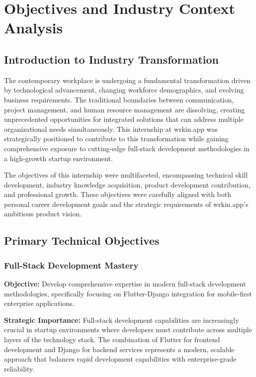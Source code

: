 \chapter{Objectives and Industry Context Analysis}

\section{Introduction to Industry Transformation}

The contemporary workplace is undergoing a fundamental transformation driven by technological advancement, changing workforce demographics, and evolving business requirements. The traditional boundaries between communication, project management, and human resource management are dissolving, creating unprecedented opportunities for integrated solutions that can address multiple organizational needs simultaneously. This internship at wrkin.app was strategically positioned to contribute to this transformation while gaining comprehensive exposure to cutting-edge full-stack development methodologies in a high-growth startup environment.

The objectives of this internship were multifaceted, encompassing technical skill development, industry knowledge acquisition, product development contribution, and professional growth. These objectives were carefully aligned with both personal career development goals and the strategic requirements of wrkin.app's ambitious product vision.

\section{Primary Technical Objectives}

\subsection{Full-Stack Development Mastery}

\textbf{Objective:} Develop comprehensive expertise in modern full-stack development methodologies, specifically focusing on Flutter-Django integration for mobile-first enterprise applications.

\textbf{Strategic Importance:} Full-stack development capabilities are increasingly crucial in startup environments where developers must contribute across multiple layers of the technology stack. The combination of Flutter for frontend development and Django for backend services represents a modern, scalable approach that balances rapid development capabilities with enterprise-grade reliability.

